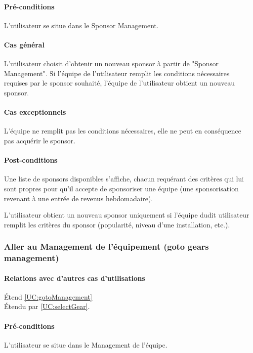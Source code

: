 \paragraph{Pré-conditions}
\begin{list}{}{\leftmargin=1.5em}
\item{L'utilisateur se situe dans le Sponsor Management.}
\end{list}
\paragraph{Cas général}
L'utilisateur choisit d'obtenir un nouveau sponsor à partir de "Sponsor Management". Si l'équipe de l'utilisateur remplit les conditions nécessaires requises par le sponsor souhaité, l'équipe de l'utilisateur obtient un nouveau sponsor. 
\paragraph{Cas exceptionnels}
L'équipe ne remplit pas les conditions nécessaires, elle ne peut en conséquence pas acquérir le sponsor. 
\paragraph{Post-conditions}
\begin{list}{}{\leftmargin=1.5em}
\item{Une liste de sponsors disponibles s'affiche, chacun requérant des critères qui lui sont propres pour qu'il accepte de sponsoriser une équipe (une sponsorisation revenant à une entrée de revenus hebdomadaire).}
\item{L'utilisateur obtient un nouveau sponsor uniquement si l'équipe dudit utilisateur remplit les critères du sponsor (popularité, niveau d'une installation, etc.).}
\end{list}

\subsubsection{Aller au Management de l'équipement (goto gears management)}
\label{UC:gotoGear}
\paragraph{Relations avec d'autres cas d'utilisations}
Étend \ref{UC:gotoManagement}\\
Étendu par \ref{UC:selectGear}.
\paragraph{Pré-conditions}
\begin{list}{}{\leftmargin=1.5em}
\item{L'utilisateur se situe dans le Management de l'équipe.}
\end{list}
